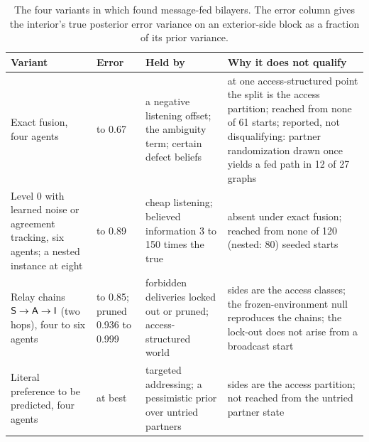 \begin{table}[t]
\centering\small
\caption{The four variants in which \citet{dennis2026communicating} found message-fed bilayers. The error column gives the interior's true posterior error variance on an exterior-side block as a fraction of its prior variance.}\label{tab:min-bilayers}
\begin{tabular}{@{}>{\raggedright\arraybackslash}p{}>{\raggedright\arraybackslash}p{}>{\raggedright\arraybackslash}p{}>{\raggedright\arraybackslash}p{}@{}}
\toprule
Variant & Error & Held by & Why it does not qualify \\
\midrule
Exact fusion, four agents & 0.48 to 0.67 & a negative listening offset; the ambiguity term; certain defect beliefs & at one access-structured point the split is the access partition; reached from none of 61 starts; reported, not disqualifying: partner randomization drawn once yields a fed path in 12 of 27 graphs \\
Level 0 with learned noise or agreement tracking, six agents; a nested instance at eight & 0.70 to 0.89 & cheap listening; believed information 3 to 150 times the true & absent under exact fusion; reached from none of 120 (nested: 80) seeded starts \\
Relay chains $\mathsf{S}\to\mathsf{A}\to\mathsf{I}$ (two hops), four to six agents & 0.76 to 0.85; pruned 0.936 to 0.999 & forbidden deliveries locked out or pruned; access-structured world & sides are the access classes; the frozen-environment null reproduces the chains; the lock-out does not arise from a broadcast start \\
Literal preference to be predicted, four agents & 0.95 at best & targeted addressing; a pessimistic prior over untried partners & sides are the access partition; not reached from the untried partner state \\
\bottomrule
\end{tabular}
\end{table}

